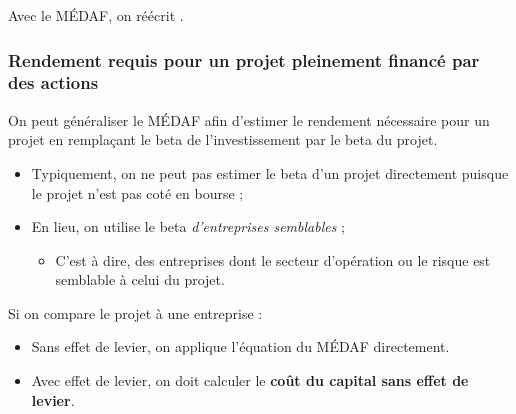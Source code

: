 \documentclass[10pt, french]{article}
\begin{document}
\begin{multicols*}{2}
\begin{definitionNOHFILLprop}
Avec le MÉDAF, on réécrit .\\
\end{definitionNOHFILLprop}


\columnbreak
\subsubsection{Rendement requis pour un projet pleinement financé par des actions}
On peut généraliser le MÉDAF afin d'estimer le rendement nécessaire pour un projet en remplaçant le beta de l'investissement par le beta du projet.

\begin{itemize}
	\item	Typiquement, on ne peut pas estimer le beta d'un projet directement puisque le projet n'est pas coté en bourse ;
	\item	En lieu, on utilise le beta \textit{d'entreprises semblables} ;
		\begin{itemize}
		\item	C'est à dire, des entreprises dont le secteur d'opération ou le risque est semblable à celui du projet.
		\end{itemize}
\end{itemize}

Si on compare le projet à une entreprise :
\begin{itemize}
	\item	Sans effet de levier, on applique l'équation du MÉDAF directement.
	\item	Avec effet de levier, on doit calculer le \textbf{coût du capital sans effet de levier}.
\end{itemize}


\end{multicols*}
\end{document}
